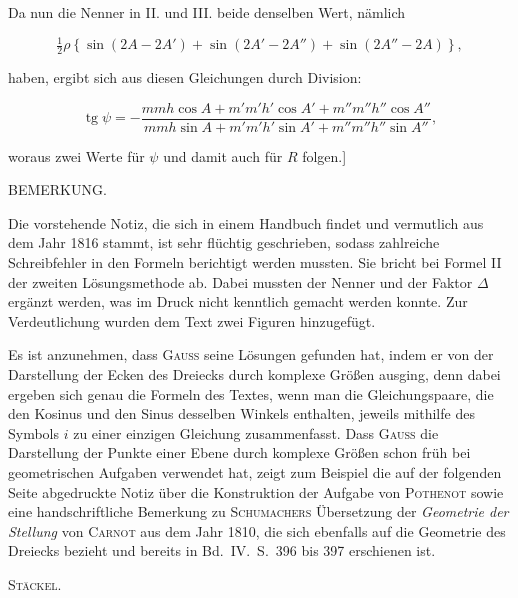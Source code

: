 Da nun die Nenner in II. und III. beide denselben Wert, nämlich

\[
\tfrac{1}{2}\rho\left\{\sin(2A-2A')+\sin(2A'-2A'')+\sin(2A''-2A)\right\},
\]

haben, ergibt sich aus diesen Gleichungen durch Division:

\[
\operatorname{tg}\psi = -\dfrac{mmh\cos A+m'm'h'\cos A'+m''m''h''\cos A''}{mmh\sin A+m'm'h'\sin A'+m''m''h''\sin A''},
\]

woraus zwei Werte für $\psi$ und damit auch für $R$ folgen.]

\bigskip
\begin{center}
\hrulefill
\end{center}
\bigskip

\begin{center}
BEMERKUNG.
\end{center}

Die vorstehende Notiz, die sich in einem Handbuch findet und vermutlich aus dem Jahr 1816 stammt, ist sehr flüchtig geschrieben, sodass zahlreiche Schreibfehler in den Formeln berichtigt werden mussten. Sie bricht bei Formel II der zweiten Lösungsmethode ab. Dabei mussten der Nenner und der Faktor $\Delta$ ergänzt werden, was im Druck nicht kenntlich gemacht werden konnte. Zur Verdeutlichung wurden dem Text zwei Figuren hinzugefügt.

Es ist anzunehmen, dass \textsc{Gauss} seine Lösungen gefunden hat, indem er von der Darstellung der Ecken des Dreiecks durch komplexe Größen ausging, denn dabei ergeben sich genau die Formeln des Textes, wenn man die Gleichungspaare, die den Kosinus und den Sinus desselben Winkels enthalten, jeweils mithilfe des Symbols $i$ zu einer einzigen Gleichung zusammenfasst. Dass \textsc{Gauss} die Darstellung der Punkte einer Ebene durch komplexe Größen schon früh bei geometrischen Aufgaben verwendet hat, zeigt zum Beispiel die auf der folgenden Seite abgedruckte Notiz über die Konstruktion der Aufgabe von \textsc{Pothenot} sowie eine handschriftliche Bemerkung zu \textsc{Schumachers} Übersetzung der \emph{Geometrie der Stellung} von \textsc{Carnot} aus dem Jahr 1810, die sich ebenfalls auf die Geometrie des Dreiecks bezieht und bereits in Bd.\ IV.\ S.\ 396 bis 397 erschienen ist.

\hfill \textsc{Stäckel}.

\bigskip
\begin{center}
\hrulefill
\end{center}
